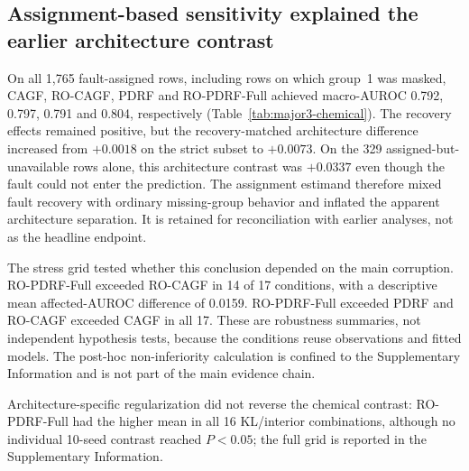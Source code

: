 \documentclass[11pt]{article}
\begin{document}
\begin{table}[ht]
\centering
\caption{Strict fault-applied-and-available macro-AUROC effects under the fixed chemical Gaussian intervention. Differences are paired across 10 optimization seeds. Exact Wilcoxon tests describe fitting stability and are not interpreted as independent-device inference.}
\label{tab:major9-strict}
\resizebox{0.78\textwidth}{!}{}
\end{table}

\subsection{Assignment-based sensitivity explained the earlier architecture contrast}

On all 1,765 fault-assigned rows, including rows on which group~1 was masked, CAGF, RO-CAGF, PDRF and RO-PDRF-Full achieved macro-AUROC 0.792, 0.797, 0.791 and 0.804, respectively (Table~\ref{tab:major3-chemical}). The recovery effects remained positive, but the recovery-matched architecture difference increased from $+0.0018$ on the strict subset to $+0.0073$. On the 329 assigned-but-unavailable rows alone, this architecture contrast was $+0.0337$ even though the fault could not enter the prediction. The assignment estimand therefore mixed fault recovery with ordinary missing-group behavior and inflated the apparent architecture separation. It is retained for reconciliation with earlier analyses, not as the headline endpoint.

The stress grid tested whether this conclusion depended on the main corruption. RO-PDRF-Full exceeded RO-CAGF in 14 of 17 conditions, with a descriptive mean affected-AUROC difference of 0.0159. RO-PDRF-Full exceeded PDRF and RO-CAGF exceeded CAGF in all 17. These are robustness summaries, not independent hypothesis tests, because the conditions reuse observations and fitted models. The post-hoc non-inferiority calculation is confined to the Supplementary Information and is not part of the main evidence chain.

Architecture-specific regularization did not reverse the chemical contrast: RO-PDRF-Full had the higher mean in all 16 KL/interior combinations, although no individual 10-seed contrast reached $P<0.05$; the full grid is reported in the Supplementary Information.

\begin{table}[ht]
\centering
\caption{Assignment-defined chemical-array sensitivity analysis. Values are means across 10 matched seeds and include 329 rows on which the assigned group was unavailable. CAGF/PDRF denotes architecture and RO denotes recovery-oriented training. The strict fault-applied result is reported in Table~\ref{tab:major9-strict}.}
\label{tab:major3-chemical}
\resizebox{0.86\textwidth}{!}{}
\end{table}
\end{document}
